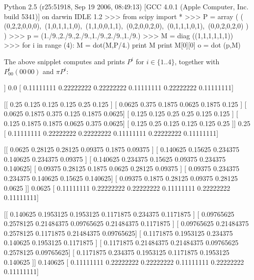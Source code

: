 \documentclass[8pt,notitlepage]{report}
\newenvironment{solution}[1][Solution]{\begin{trivlist}
    \item[\hskip \labelsep {\bfseries #1}]}{\end{trivlist}}
\begin{document}
\begin{solution}
\begin{verbatimtab}[4]
Python 2.5 (r25:51918, Sep 19 2006, 08:49:13) 
[GCC 4.0.1 (Apple Computer, Inc. build 5341)] on darwin
IDLE 1.2      
>>> from scipy import *
>>> P = array ( ( (0,2,2,0,0,0),\
		(1,0,1,1,1,0),\
		(1,1,0,0,1,1),\
		(0,2,0,0,2,0),\
		(0,1,1,1,0,1),\
		(0,0,2,0,2,0) ) )
>>> p = (1./9.,2./9.,2./9.,1./9.,2./9.,1./9.)
>>> M = diag ((1,1,1,1,1,1))
>>> for i in range (4):
		M = dot(M,P/4.)
		print M
		print M[0][0]
		o = dot (p,M)
\end{verbatimtab}

The above snipplet computes and prints $P^i$ for $i \in \{1..4\}$, together with 
$P^i_{00} (00\,00)$ and $\pi P^i$:

\small
\begin{verbatimtab}[4]
[[ 0.    0.5   0.5   0.    0.    0.  ]
 [ 0.25  0.    0.25  0.25  0.25  0.  ]
 [ 0.25  0.25  0.    0.    0.25  0.25]
 [ 0.    0.5   0.    0.    0.5   0.  ]
 [ 0.    0.25  0.25  0.25  0.    0.25]
 [ 0.    0.    0.5   0.    0.5   0.  ]]
0.0
[ 0.11111111  0.22222222  0.22222222  0.11111111  0.22222222  0.11111111] 

[[ 0.25    0.125   0.125   0.125   0.25    0.125 ]
 [ 0.0625  0.375   0.1875  0.0625  0.1875  0.125 ]
 [ 0.0625  0.1875  0.375   0.125   0.1875  0.0625]
 [ 0.125   0.125   0.25    0.25    0.125   0.125 ]
 [ 0.125   0.1875  0.1875  0.0625  0.375   0.0625]
 [ 0.125   0.25    0.125   0.125   0.125   0.25  ]]
0.25
[ 0.11111111  0.22222222  0.22222222  0.11111111  0.22222222  0.11111111]

[[ 0.0625    0.28125   0.28125   0.09375   0.1875    0.09375 ]
 [ 0.140625  0.15625   0.234375  0.140625  0.234375  0.09375 ]
 [ 0.140625  0.234375  0.15625   0.09375   0.234375  0.140625]
 [ 0.09375   0.28125   0.1875    0.0625    0.28125   0.09375 ]
 [ 0.09375   0.234375  0.234375  0.140625  0.15625   0.140625]
 [ 0.09375   0.1875    0.28125   0.09375   0.28125   0.0625  ]]
0.0625
[ 0.11111111  0.22222222  0.22222222  0.11111111  0.22222222  0.11111111] 

[[ 0.140625    0.1953125   0.1953125   0.1171875   0.234375    0.1171875 ]
 [ 0.09765625  0.2578125   0.21484375  0.09765625  0.21484375  0.1171875 ]
 [ 0.09765625  0.21484375  0.2578125   0.1171875   0.21484375  0.09765625]
 [ 0.1171875   0.1953125   0.234375    0.140625    0.1953125   0.1171875 ]
 [ 0.1171875   0.21484375  0.21484375  0.09765625  0.2578125   0.09765625]
 [ 0.1171875   0.234375    0.1953125   0.1171875   0.1953125   0.140625  ]]
0.140625
[ 0.11111111  0.22222222  0.22222222  0.11111111  0.22222222  0.11111111]
\end{verbatimtab}
\normalsize


\end{solution}
\end{document}
